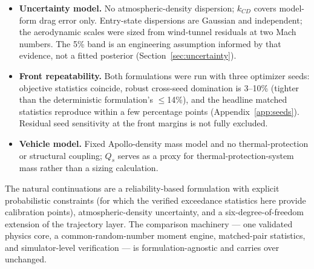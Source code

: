 \begin{itemize}
        coupling of attitude and entry loads; the guidance realization is
        bracketed by the alternate-law verification of
        Section~\ref{sec:guidance}. Load factors are the
        drag-based metric with the 4--5\% total-force correction noted in
        Section~\ref{sec:traj}.
  \item \textbf{Uncertainty model.} No atmospheric-density dispersion;
        $k_{CD}$ covers model-form drag error only. Entry-state
        dispersions are Gaussian and independent; the aerodynamic scales
        were sized from wind-tunnel residuals at two Mach numbers. The
        5\% band is an engineering assumption informed by that evidence,
        not a fitted posterior
        (Section~\ref{sec:uncertainty}).
  \item \textbf{Front repeatability.} Both formulations were run with
        three optimizer seeds: objective statistics coincide, robust
        cross-seed domination is 3--10\% (tighter than the deterministic
        formulation's $\le$14\%), and the headline matched statistics
        reproduce within a few percentage points
        (Appendix~\ref{app:seeds}). Residual seed sensitivity at the
        front margins is not fully excluded.
  \item \textbf{Vehicle model.} Fixed Apollo-density mass model and no
        thermal-protection or structural coupling; $Q_s$ serves as a
        proxy for thermal-protection-system mass rather than a sizing
        calculation.
\end{itemize}

The natural continuations are a reliability-based formulation with explicit
probabilistic constraints (for which the verified exceedance statistics
here provide calibration points), atmospheric-density uncertainty, and a
six-degree-of-freedom extension of the trajectory layer. The comparison
machinery --- one validated physics core, a common-random-number moment
engine, matched-pair statistics, and simulator-level verification --- is
formulation-agnostic and carries over unchanged.
